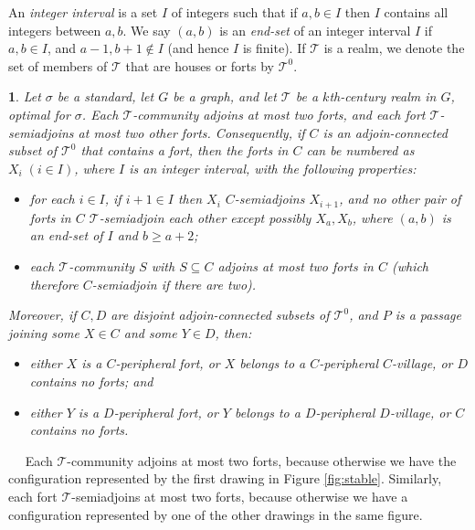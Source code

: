 \documentclass[titlepage,11pt]{article}
\newcommand{\rk}{\operatorname{rk}}
\newcommand{\mac}{\mathcal}
\newtheorem{thm}{}[section]
\newcommand{\Proof}{\noindent{\bf Proof.}\ \ }
\begin{document}
	
	An {\em integer interval} is a set $I$ of integers such that if $a,b\in I$ then $I$ contains all integers between $a,b$. We say $(a,b)$
	is an {\em end-set} of an integer interval $I$ if $a,b\in I$, and $a-1,b+1\notin I$ (and hence $I$ is finite).
	If $\mac T$ is a realm, we denote the set of members of $\mac T$ that are houses or forts by $\mac T^0$.
	\begin{thm}\label{contactgraph}
		Let $\sigma$ be a standard, let
		$G$ be a graph, and
		let $\mathcal{T}$ be a $k$th-century realm in $G$, optimal for $\sigma$. 
		Each $\mac T$-community adjoins at most two forts, and 
		each fort $\mac T$-semiadjoins at most two other forts. Consequently, if 
		$C$ is an adjoin-connected subset of $\mac T^0$ that contains a fort, then  
		the forts in $C$ can be numbered as $X_i\;(i\in I)$, where $I$ is an integer interval, with the following properties:
		\begin{itemize}
			\item for each $i\in I$, if $i+1\in I$ then $X_i$ $C$-semiadjoins $X_{i+1}$, and no other pair of forts in $C$  $\mac T$-semiadjoin  each other 
			except possibly $X_a,X_b$, where $(a,b)$ is an end-set of $I$ and $b\ge a+2$;
			\item each $\mac T$-community  $S$  with $S\subseteq C$ adjoins at most two forts in $C$ (which therefore $C$-semiadjoin if there are two).
		\end{itemize}
		Moreover, if $C,D$ are disjoint adjoin-connected subsets of $\mac T^0$, and $P$ is a passage joining some $X\in C$ and some  $Y\in D$,
		then:
		\begin{itemize}
			\item  either $X$ is a $C$-peripheral fort, or $X$ belongs to a $C$-peripheral $C$-village, or $D$ contains no forts; and 
			\item either $Y$ 
			is a $D$-peripheral fort, or $Y$ belongs to a $D$-peripheral $D$-village,
			or $C$ contains no forts.
		\end{itemize}
	\end{thm}
	\Proof
	Each $\mac T$-community adjoins at most two forts, because otherwise we have the configuration represented by the first drawing in Figure \ref{fig:stable}. 
	Similarly, each fort $\mac T$-semiadjoins at most two forts, because otherwise we have a configuration represented by one of the other
	drawings in the same figure.
	
\end{document}
